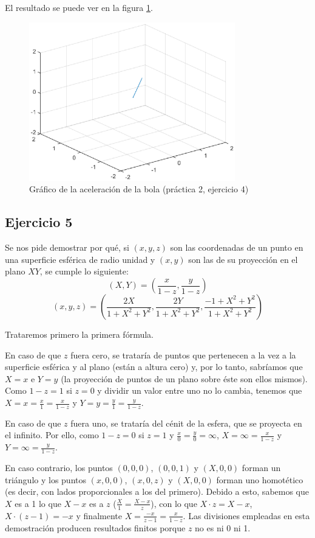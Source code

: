 \documentclass{article}
\newcommand{\fref}[1]{figura \ref{fig:#1}}
\newcommand{\sej}[1]{\subsection{Ejercicio #1}}
\begin{document}
El resultado se puede ver en la \fref{grafacel}.
\begin{figure}[h]
\centering
\includegraphics[width=0.8\textwidth]{practica2_ex4.eps}
\caption{Gráfico de la aceleración de la bola (práctica 2, ejercicio 4)}
\label{fig:grafacel}
\end{figure}

\sej{5}
Se nos pide demostrar por qué, si $(x,y,z)$ son las coordenadas de un punto en una superficie esférica de radio unidad y $(x,y)$ son las de su proyección 
en el plano $XY$, se cumple lo siguiente:
\[ (X,Y) = \left(\frac{x}{1-z},\frac{y}{1-z}\right) \]
\[ (x,y,z) = \left(\frac{2 X}{1+X^2+Y^2},\frac{2 Y}{1+X^2+Y^2},\frac{-1+X^2+Y^2}{1+X^2+Y^2}\right) \]

Trataremos primero la primera fórmula.

En caso de que $z$ fuera cero, se trataría de puntos que pertenecen a la vez a la superficie esférica y al plano (están a altura cero) y, por lo tanto, sabríamos que $X=x$ e 
$Y=y$ (la proyección de puntos de un plano sobre éste son ellos mismos). Como $1-z=1$ si $z=0$ y dividir un valor entre uno no lo cambia, tenemos que 
$X=x=\frac{x}{1}=\frac{x}{1-z}$ y $Y=y=\frac{y}{1}=\frac{y}{1-z}$.

En caso de que $z$ fuera uno, se trataría del cénit de la esfera, que se proyecta en el infinito. Por ello, como $1-z=0$ si $z=1$ y $\frac{x}{0}=\frac{y}{0}=\infty$, 
$X=\infty=\frac{x}{1-z}$ y $Y=\infty=\frac{y}{1-z}$.

En caso contrario, los puntos $(0,0,0)$, $(0,0,1)$ y $(X,0,0)$ forman un triángulo y los puntos $(x,0,0)$, $(x,0,z)$ y $(X,0,0)$ forman uno homotético (es decir,
con lados proporcionales a los del primero). Debido a esto, sabemos que $X$ es a 1 lo que $X-x$ es a $z$ ($\frac{X}{1}=\frac{X-x}{z}$), con lo que $X \cdot z = X - x$, $X \cdot
(z-1) = -x$ y finalmente $X = \frac{-x}{z-1} = \frac{x}{1-z}$. Las divisiones empleadas en esta demostración producen resultados finitos porque $z$ no es ni 0 ni 1. 
\end{document}
